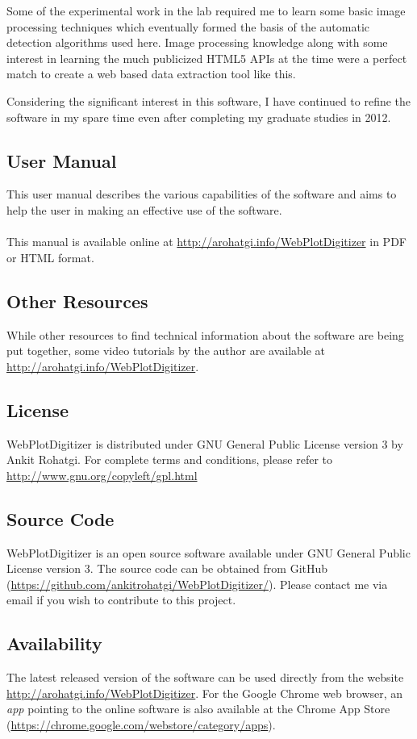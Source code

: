 \documentclass[letterpaper]{article}
\begin{document}
Some of the experimental work in the lab required me to learn some basic image processing techniques which eventually formed the basis of the automatic detection algorithms used here. Image processing knowledge along with some interest in learning the much publicized HTML5 APIs at the time were a perfect match to create a web based data extraction tool like this.

Considering the significant interest in this software, I have continued to refine the software in my spare time even after completing my graduate studies in 2012.
\subsection{User Manual}
This user manual describes the various capabilities of the software and aims to help the user in making an effective use of the software. 
\\
\\
This manual is available online at \url{http://arohatgi.info/WebPlotDigitizer} in PDF or HTML format.

\subsection{Other Resources}
While other resources to find technical information about the software are being put together, some video tutorials by the author are available at \url{http://arohatgi.info/WebPlotDigitizer}.

\subsection{License}
WebPlotDigitizer is distributed under GNU General Public License version 3 by Ankit Rohatgi. For complete terms and conditions, please refer to \url{http://www.gnu.org/copyleft/gpl.html}
\subsection{Source Code}
WebPlotDigitizer is an open source software available under GNU General Public License version 3. The source code can be obtained from GitHub (\url{https://github.com/ankitrohatgi/WebPlotDigitizer/}). Please contact me via email if you wish to contribute to this project.

\subsection{Availability}
The latest released version of the software can be used directly from the website \url{http://arohatgi.info/WebPlotDigitizer}. For the Google Chrome web browser, an \emph{app} pointing to the online software is also available at the Chrome App Store (\url{https://chrome.google.com/webstore/category/apps}).
\end{document}

